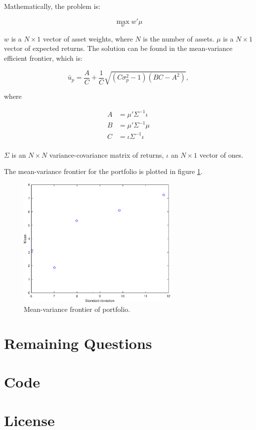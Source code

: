 \documentclass[a4paper]{article}
\begin{document}
Mathematically, the problem is:

\begin{equation*}
    \max_{w} w'\mu
\end{equation*}

\(w\) is a \(N\times1\) vector of asset weights, where \(N\) is the number of assets. $\mu$ is a \(N\times1\) vector of expected returns. The solution can be found in the mean-variance efficient frontier, which is:

\begin{equation*}
    \bar{u}_p = \frac{A}{C} + \frac{1}{C} \sqrt{(C\sigma^2_p - 1)(BC - A^2)},
\end{equation*}

where

\begin{align*}
    A &= \mu'\Sigma^{-1}\iota  \\
    B &= \mu'\Sigma^{-1}\mu    \\
    C &= \iota\Sigma^{-1}\iota \\
\end{align*}

$\Sigma$ is an \(N\times N\) variance-covariance matrix of returns, $\iota$ an \(N\times 1\) vector of ones.

The mean-variance frontier for the portfolio is plotted in figure \ref{figure_mv_frontier}.

\begin{figure}[H]
    \centering
    \includegraphics[width=0.7\textwidth, keepaspectratio]{figures/mv_frontier.eps}
    \caption{Mean-variance frontier of portfolio.}
    \label{figure_mv_frontier}
\end{figure}

\section{Remaining Questions}

\appendix

\section{Code}



\section{License}

\doclicenseThis
\end{document}
